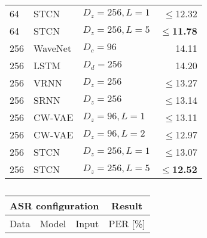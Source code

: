 {\begin{table}[t]
\begin{subtable}[t]{.45\textwidth}
\begin{adjustbox}{center, totalheight=0.35\paperheight}
\begin{tabular}[t]{lll|r}
        64 & STCN               & $D_z=256,L=1$               & $\leq$12.32 \\  %
        64 & STCN               & $D_z=256,L=5$               & $\leq$\textbf{11.78} \\
        \midrule
        256 & WaveNet           & $D_c=96$                    & 14.11 \\  %
        256 & LSTM              & $D_d=256$                   & 14.20 \\  %
        256 & VRNN              & $D_z=256$                   & $\leq$13.27 \\  %
        256 & SRNN              & $D_z=256$                   & $\leq$13.14 \\  %
        256 & CW-VAE            & $D_z=96,L=1$                & $\leq$13.11 \\
        256 & CW-VAE            & $D_z=96,L=2$                & $\leq$12.97 \\
        256 & STCN              & $D_z=256,L=1$               & $\leq$13.07 \\  %
        256 & STCN              & $D_z=256,L=5$               & $\leq$\textbf{12.52} \\
        \bottomrule
    \end{tabular}
    \end{adjustbox}
    \vspace{1mm}
    \caption{}
    \vspace{-1mm}
    \label{tab: likelihoods timit}
    \end{subtable}%
    \hfill
    \begin{subtable}[t]{.45\textwidth}
    \centering
    \begin{adjustbox}{center, totalheight=0.35\paperheight}
    \begin{tabular}[t]{cll|c}
        \toprule
        \multicolumn{3}{c}{\bfseries ASR configuration} & \multicolumn{1}{c}{\textbf{Result}} \\
        \midrule
        Data   &  Model           & Input         &  PER [\%]  \\
                \midrule

\end{tabular}
\end{adjustbox}
\end{subtable}
\end{table}}
